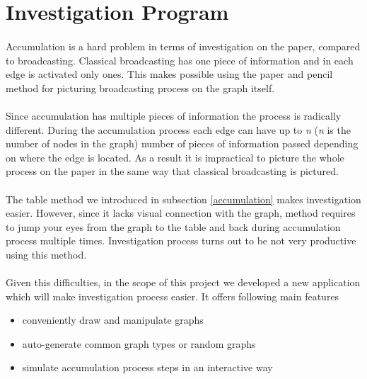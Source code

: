 \documentclass[a4paper,TexShade]{class}
\begin{document}
\newpage
\section{Investigation Program}

\paragraph{} Accumulation is a hard problem in terms of investigation on the paper, compared to broadcasting. Classical broadcasting has one piece of information and in each edge is activated only ones. This makes possible using the paper and pencil method for picturing broadcasting process on the graph itself. 

\paragraph{} Since accumulation has multiple pieces of information the process is radically different. During the accumulation process each edge can have up to \textit{n} (\textit{n} is the number of nodes in the graph) number of pieces of information passed depending on where the edge is located. As a result it is impractical to picture the whole process on the paper in the same way that classical broadcasting is pictured.

\paragraph{} The table method we introduced in subsection \ref{accumulation} makes investigation easier. However, since it lacks visual connection with the graph, method requires to jump your eyes from the graph to the table and back during accumulation process multiple times. Investigation process turns out to be not very productive using this method.

\paragraph{} Given this difficulties, in the scope of this project we developed a new application which will make investigation process easier. It offers following main features

\bigskip
\begin{itemize}
\item conveniently draw and manipulate graphs
\item auto-generate common graph types or random graphs
\item simulate accumulation process steps in an interactive way
\end{itemize}
\end{document}
